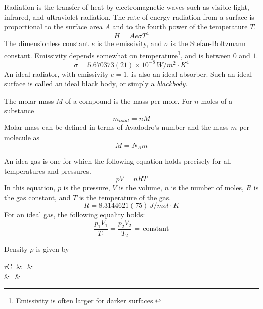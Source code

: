 \documentclass[nobib,notoc]{tufte-handout}
\begin{document}
\begin{defi}
	Radiation is the transfer of heat by electromagnetic waves such as visible light, infrared, and ultraviolet radiation. The rate of energy radiation from a surface is proportional to the surface area \(A\) and to the fourth power of the temperature \(T\).
	\begin{equation*}
		H=Ae\sigma T^4
	\end{equation*}
	The dimensionless constant \(e\) is the emissivity, and \(\sigma\) is the Stefan-Boltzmann constant. Emissivity depends somewhat on temperature\footnote{Emissivity is often larger for darker surfaces.}, and is between \(0\) and \(1\).
	\begin{equation*}
		\sigma=5.670373(21)\times 10^{-8}\, W/m^2\cdot K^4
	\end{equation*}
	An ideal radiator, with emissivity \(e=1\), is also an ideal absorber. Such an ideal surface is called an ideal black body, or simply a \emph{blackbody}.
\end{defi}
\begin{defi}
	The molar mass \(M\) of a compound is the mass per mole. For \(n\) moles of a substance
	\begin{equation*}
		m_{total}=nM
	\end{equation*}
	Molar mass can be defined in terms of Avadodro's number and the mass \(m\) per molecule as
	\begin{equation*}
		M=N_Am
	\end{equation*}
\end{defi}
\begin{defi}
	An idea gas is one for which the following equation holds precisely for all temperatures and pressures.
	\begin{equation*}
		pV=nRT
	\end{equation*}
	In this equation, \(p\) is the pressure, \(V\) is the volume, \(n\) is the number of moles, \(R\) is the gas constant, and \(T\) is the temperature of the gas.
	\begin{equation*}
		R=8.3144621(75)\,J/mol\cdot K
	\end{equation*}
	For an ideal gas, the following equality holds:
	\begin{equation*}
		\frac{p_1V_1}{T_1}=\frac{p_2V_2}{T_2}=\,\text{constant}
	\end{equation*}
\end{defi}
\begin{defi}[Density]
	Density \(\rho\) is given by
	\begin{IEEEeqnarray*}{rCl}
		\rho&=&\\
		&=&
	\end{IEEEeqnarray*}
\end{defi}
\end{document}

